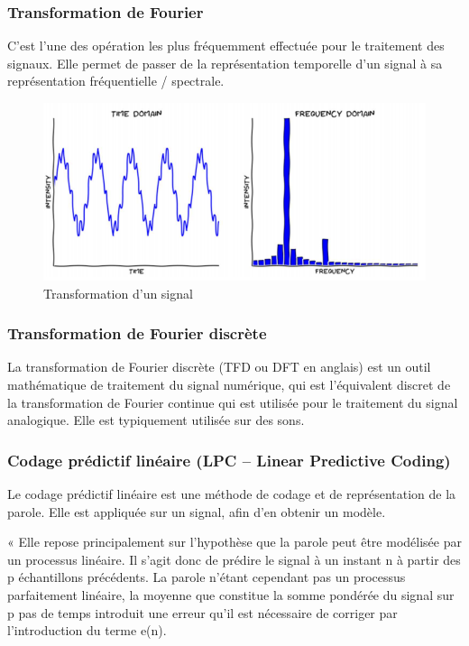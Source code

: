 \documentclass[a4paper, 12pt]{book}
\begin{document}
\subsubsection{Transformation de Fourier}

C'est l'une des opération les plus fréquemment effectuée pour le traitement des signaux. Elle permet de passer de la représentation temporelle d'un signal à sa représentation fréquentielle / spectrale.

\begin{figure}[htbp]
  \centering
  \includegraphics[width=1\linewidth]{fig/fourier.png}
  \caption{Transformation d'un signal}
\end{figure}

\subsubsection{Transformation de Fourier discrète}

La transformation de Fourier discrète (TFD ou DFT en anglais) est un outil mathématique de traitement du signal numérique, qui est l'équivalent discret de la transformation de Fourier continue qui est utilisée pour le traitement du signal analogique. Elle est typiquement utilisée sur des sons.

\subsubsection{Codage prédictif linéaire (LPC – Linear Predictive Coding)}

Le codage prédictif linéaire est une méthode de codage et de représentation de la parole. Elle est appliquée sur un signal, afin d'en obtenir un modèle.

« Elle repose principalement sur l'hypothèse que la parole peut être modélisée par un processus linéaire. Il s'agit donc de prédire le signal à un instant n à partir des p échantillons précédents. La parole n'étant cependant pas un processus parfaitement linéaire, la moyenne que constitue la somme pondérée du signal sur p pas de temps introduit une erreur qu'il est nécessaire de corriger par l'introduction du terme e(n).
\end{document}
